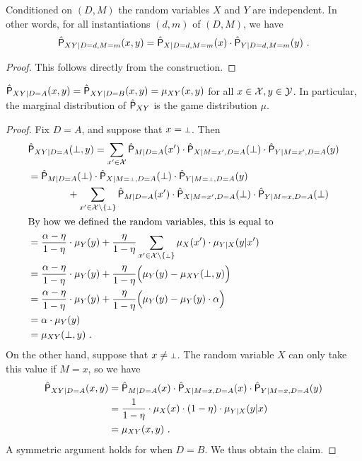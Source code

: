 \begin{claim}
\label{clm:dependency-breaking-1}
	Conditioned on $(D,M)$ the random variables $X$ and $Y$ are independent. In other words, for all instantiations $(d,m)$ of $(D,M)$, we have
	\[
		\hat{\P}_{XY | D=d,M=m}(x,y) = \hat{\P}_{X | D=d,M=m}(x) \cdot \hat{\P}_{Y | D=d,M=m}(y)~.
	\]
\end{claim}
\begin{proof}
	This follows directly from the construction.
\end{proof}


\begin{claim}
\label{clm:dependency-breaking-2}
 $\hat{\P}_{XY|D = A}(x,y) = \hat{\P}_{XY|D=B}(x,y) = \mu_{XY}(x,y)$ for all $x \in \X,y \in \Y$. In particular, the marginal distribution of $\hat{\P}_{XY}$ is the game distribution $\mu$. 
\end{claim}
\begin{proof}
	Fix $D = A$, and suppose that $x = \dummy$. Then 
	\begin{align*}
		&\hat{\P}_{XY | D = A}(\dummy,y) = \sum_{x' \in \X} \hat{\P}_{M | D = A}(x') \cdot \hat{\P}_{X | M=x',D=A}(\dummy) \cdot  \hat{\P}_{Y | M = x', D = A}(y)  \\
		&= \hat{\P}_{M | D = A}(\dummy) \cdot \hat{\P}_{X | M = \dummy, D = A}(\dummy) \cdot  \hat{\P}_{Y | M = \dummy, D = A}(y) \\
		& \qquad \qquad + \sum_{x' \in \X \setminus \{\dummy\}} \hat{\P}_{M | D = A}(x') \cdot \hat{\P}_{X | M = x', D = A}(\dummy) \cdot  \hat{\P}_{Y | M = x, D = A}(\dummy) \\
		\intertext{By how we defined the random variables, this is equal to}
		&= \frac{\alpha - \eta}{1 - \eta} \cdot \mu_Y(y) + \frac{\eta}{1 - \eta} \sum_{x' \in \X \setminus \{\dummy\}} \mu_X(x') \cdot \mu_{Y|X}(y|x') \\
		&= \frac{\alpha - \eta}{1 - \eta} \cdot \mu_Y(y) + \frac{\eta}{1 - \eta} \Big ( \mu_Y(y) - \mu_{XY}(\dummy,y) \Big ) \\
		&= \frac{\alpha - \eta}{1 - \eta} \cdot \mu_Y(y) + \frac{\eta}{1 - \eta} \Big ( \mu_Y(y) - \mu_{Y}(y) \cdot \alpha \Big ) \\
		&= \alpha \cdot \mu_Y(y) \\
		&= \mu_{XY}(\dummy,y)~.
	\end{align*}
	On the other hand, suppose that $x \neq \dummy$. The random variable $X$ can only take this value if $M = x$, so we have
	\begin{align*}
		\hat{\P}_{XY | D = A}(x,y) &= \hat{\P}_{M | D = A}(x) \cdot \hat{\P}_{X | M = x, D = A}(x) \cdot  \hat{\P}_{Y | M=x, D=A}(y) \\
		&= \frac{1}{1 - \eta} \cdot \mu_X(x) \cdot (1 - \eta) \cdot \mu_{Y|X}(y | x) \\
		&= \mu_{XY}(x,y)~.
	\end{align*}
	A symmetric argument holds for when $D = B$. We thus obtain the claim.
\end{proof}



